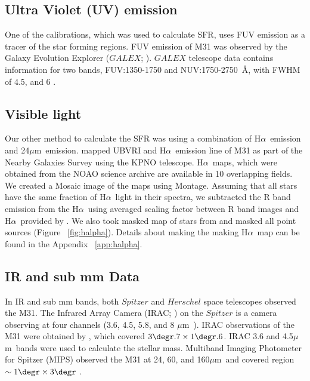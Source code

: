 \documentclass[useAMS,usenatbib]{mn2e}
\newcommand \halpha    {H$\alpha $\ }
\newcommand \um    {$\mu$m\ }
\begin{document}
\subsection{Ultra Violet (UV) emission}

One of the calibrations, which was used to calculate SFR, uses FUV emission as a tracer of the star forming regions. FUV emission of M31 was observed by the Galaxy Evolution Explorer ($GALEX$; \citep{Martin05}). $GALEX$ telescope data contains information for two bands, FUV:1350-1750 and NUV:1750-2750~\AA, with FWHM of 4\arcsec .5, and 6 \arcsec.

\subsection{Visible light}
Our other method to calculate the SFR was using a combination of \halpha emission and 24\um emission. \cite{Massey06, Massey07} mapped UBVRI and \halpha emission line of M31 as part of the Nearby Galaxies Survey using the KPNO telescope. \halpha maps, which were obtained from the NOAO science archive are available in 10 overlapping fields. We created a Mosaic image of the maps using Montage. Assuming that all stars have the same fraction of \halpha light in their spectra, we subtracted the R band emission from the \halpha using averaged scaling factor between R band images and \halpha provided by \cite{Azimlu11}. We also took masked map of stars from \cite{Azimlu11} and masked all point sources (Figure ~\ref{fig:halpha}). Details about making the making \halpha map can be found in the Appendix ~\ref{app:halpha}.

\subsection{IR and sub mm Data}
In IR and sub mm bands, both $Spitzer$ \citep{Wener04} and $Herschel$ \citep{Pilbratt10}  space telescopes observed the M31. The Infrared Array Camera (IRAC; \citep{Fazio04}) on the $Spitzer$ is a camera observing at four channels (3.6, 4.5, 5.8, and 8 \um). IRAC observations of the M31 were obtained by \cite{Barmby06}, which covered $3\degr.7 \times 1\degr.6$. IRAC 3.6 and 4.5\um bands  were used to calculate the stellar mass. Multiband Imaging Photometer for Spitzer (MIPS) observed the  M31 at 24, 60, and 160\um and covered region $\sim 1\degr \times 3\degr$ \citep{Gordon06}.
\end{document}
